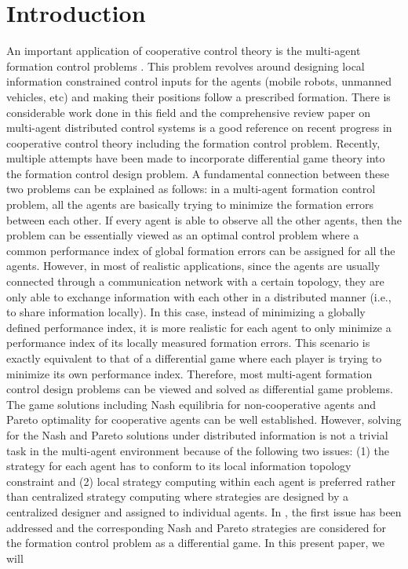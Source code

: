 \documentclass[12pt,draftcls,onecolumn]{IEEEtran}  %
\begin{document}
\newtheorem{Def}{Definition}
\newtheorem{Asu}{Assumption}
\newtheorem{thm}{Theorem}
\newtheorem{Pro}{Proposition}
\newtheorem{Alg}{Algorithm}
\newtheorem{Lem}{Lemma}
\newtheorem{Rmk}{Remark}
\newtheorem{Cor}{Corollary}

\section{Introduction}
{An} important application of cooperative control theory \cite{ren,Qu} {is} the multi-agent formation control problems \cite{Stipanovic2004,Keviczky2008,JiananWang2012}. {This problem revolves around designing} local information constrained control inputs for the agents (mobile robots, unmanned vehicles, etc) and {making} their positions {follow} a prescribed formation. There {is considerable work} done in this field and the comprehensive review paper \cite{Cao2013} on multi-agent distributed control systems is a good reference on {recent} progress {in} cooperative control theory including the formation control problem. Recently, multiple attempts \cite{anderson1998formation,DongbingGu2008,SemsarKazerooni20092205} have been made to incorporate {differential} game theory \cite{Isaacs,Basar} into the formation control design problem. {A fundamental connection {between these two problems} can be explained as follows: in a multi-agent formation control problem, all the agents are basically trying to minimize the formation errors between each other. If every agent is able to observe all the other agents, then the problem can be essentially viewed as an optimal control problem where a common performance index of global formation errors can be assigned for all the agents. However, in most of {realistic} applications,} since the agents are usually connected through {a} communication network {with} a certain topology, they are only able to exchange information with each other in a distributed manner (i.e., to share information locally). {In {this} case, instead of minimizing a globally defined performance index, it is {more realistic} for each agent to only minimize a performance index of its locally measured formation errors. This scenario is exactly equivalent to that of a differential game where each player is trying to minimize its own performance index. Therefore, most {multi-agent} formation control design {problems} can be viewed and solved as {differential game problems}. The game solutions including {Nash equilibria} for non-cooperative agents and Pareto optimality for cooperative agents can {be} well established. However, solving {for} the Nash and Pareto solutions under distributed information is not a trivial task in the multi-agent environment because of the following two {issues}: (1) the strategy for each agent has to conform to its local information topology constraint and (2) local strategy computing within each agent is preferred rather than centralized strategy computing where strategies are designed by a centralized designer and assigned to individual agents.} In \cite{DongbingGu2008,SemsarKazerooni20092205}, the first {issue} has been addressed and the corresponding Nash and Pareto strategies are considered for the formation control problem as a differential game. {In} this present paper, we will 
\end{document}
